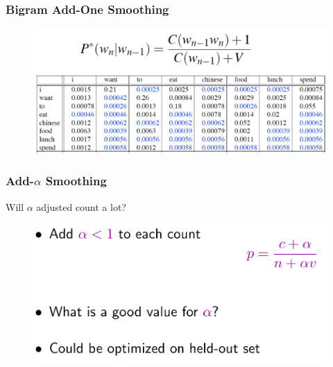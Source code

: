 \documentclass{beamer}
\begin{document}
\begin{frame}\frametitle{Bigram Add-One Smoothing}
\begin{figure}
\includegraphics[width=0.9\linewidth]{figure/bigram_addone_smoothing.pdf}
\label{fig:bigram_addone_smoothing}
\end{figure}

\end{frame}


\begin{frame}\frametitle{Add-$\alpha$ Smoothing}

\begin{block}{Will $\alpha$ adjusted count a lot?}
\begin{figure}
\includegraphics[width=0.8\linewidth]{figure/add_alpha_smoothing.pdf}
\label{fig:add_alpha_smoothing}
\end{figure}
\end{block}

\end{frame}
\end{document}
